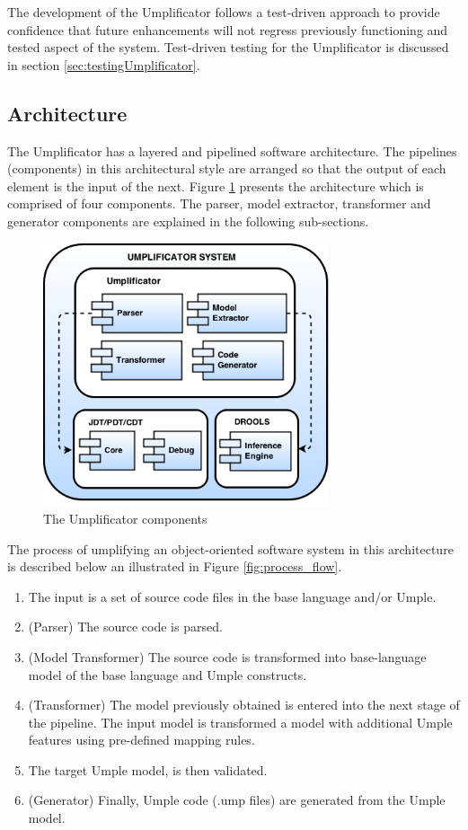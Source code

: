 The development of the Umplificator follows a test-driven approach to provide confidence that future enhancements will not regress previously functioning and tested aspect of the system. Test-driven testing for the Umplificator is discussed in section \ref{sec:testingUmplificator}. 

\subsection{Architecture}
\label{sec:architecture}

The Umplificator has a layered and pipelined software architecture. The pipelines (components) in this architectural style are arranged so that the output of each element is the input of the next.  Figure \ref{fig:architecture} presents the architecture which is comprised  of four components. The parser, model extractor, transformer and generator components are explained in the following sub-sections.

\begin{figure}[!t]
\centering
\includegraphics[width=0.75\textwidth]{Figures/UmplificatorComponents.png} 
\caption{The Umplificator components}
\label{fig:architecture}
\end{figure}

The process of umplifying an object-oriented software system in this architecture is described below an illustrated in Figure \ref{fig:process_flow}.

\begin{enumerate}
\item  The input is a set of source code files in the base language and/or Umple.
\item (Parser) The source code is parsed. 
\item (Model Transformer) The source code is transformed into base-language model of the base language and Umple constructs.
\item (Transformer) The model previously obtained is entered into the next stage of the pipeline. The input model is transformed a model with additional Umple features using pre-defined mapping rules. 
\item The target Umple model, is then validated. 
\item (Generator) Finally, Umple code (.ump files) are generated from the Umple model.
\end{enumerate}


